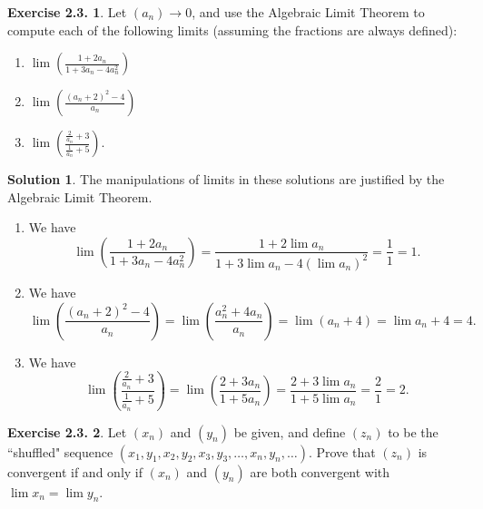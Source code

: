 \documentclass[12pt]{article}
\theoremstyle{definition}
\theoremstyle{exercise}
\newtheorem{exercise}{Exercise 2.3.}
\theoremstyle{solution}
\newtheorem*{solution}{Solution}
\begin{document}
\begin{exercise}
\label{ex:4}
    Let \( (a_n) \to 0 \), and use the Algebraic Limit Theorem to compute each of the following limits (assuming the fractions are always defined):
    \begin{enumerate}
        \item \( \lim \left( \frac{1 + 2 a_n}{1 + 3 a_n - 4 a_n^2} \right) \)

        \item \( \lim \left( \frac{(a_n + 2)^2 - 4}{a_n} \right) \)

        \item \( \lim \left( \frac{\frac{2}{a_n} + 3}{\frac{1}{a_n} + 5} \right) \).
    \end{enumerate}
\end{exercise}

\begin{solution}
    The manipulations of limits in these solutions are justified by the Algebraic Limit Theorem.
    \begin{enumerate}
        \item We have
        \[
            \lim \left( \frac{1 + 2 a_n}{1 + 3 a_n - 4 a_n^2} \right) = \frac{1 + 2 \lim a_n}{1 + 3 \lim a_n - 4 (\lim a_n)^2} = \frac{1}{1} = 1.
        \]

        \item We have
        \[
            \lim \left( \frac{(a_n + 2)^2 - 4}{a_n} \right) = \lim \left( \frac{a_n^2 + 4 a_n}{a_n} \right) = \lim (a_n + 4) = \lim a_n + 4 = 4.
        \]

        \item We have
        \[
            \lim \left( \frac{\frac{2}{a_n} + 3}{\frac{1}{a_n} + 5} \right) = \lim \left( \frac{2 + 3 a_n}{1 + 5 a_n} \right) = \frac{2 + 3 \lim a_n}{1 + 5 \lim a_n} = \frac{2}{1} = 2.
        \]
    \end{enumerate}
\end{solution}

\begin{exercise}
\label{ex:5}
    Let \( (x_n) \) and \( (y_n) \) be given, and define \( (z_n) \) to be the ``shuffled" sequence \( (x_1, y_1, x_2, y_2, x_3, y_3, \ldots, x_n, y_n, \ldots) \). Prove that \( (z_n) \) is convergent if and only if \( (x_n) \) and \( (y_n) \) are both convergent with \( \lim x_n = \lim y_n \).
\end{exercise}
\end{document}
